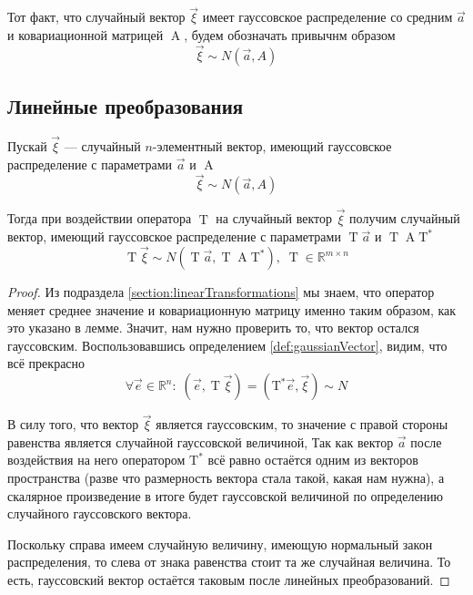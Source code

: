 \begin{definition}
    Тот факт, что случайный вектор $\vec{\xi}$ имеет гауссовское распределение
    со средним $\vec{a}$ и ковариационной матрицей
    $\operatorname{A}$, будем обозначать привычнм образом
    $$\vec{\xi} \sim N\left( \vec{a}, A \right)$$
\end{definition}

\subsection{Линейные преобразования}

\begin{lemma}\label{lemma:gaussTransformed}
    Пускай $\vec{\xi}$ --- случайный $n$-элементный вектор, имеющий гауссовское
    распределение с параметрами $\vec{a}$ и $\operatorname{A}$
    $$\vec{\xi} \sim N\left( \vec{a}, A \right)$$

    Тогда при воздействии оператора $\operatorname{T}$ на случайный вектор
    $\vec{\xi}$ получим случайный вектор, имеющий гауссовское распределение с
    параметрами $\operatorname{T} \vec{a} $ и
    $\operatorname{T} \operatorname{A} \operatorname{T^*}$
    $$\operatorname{T} \vec{\xi} \sim N\left( \operatorname{T}\vec{a} ,
        \operatorname{T} \operatorname{A} \operatorname{T^*} \right),\;
        \operatorname{T} \in \mathbb{R}^{m \times n}$$
\end{lemma}
\begin{proof}
    Из подраздела \ref{section:linearTransformations} мы знаем, что оператор
    меняет среднее значение и ковариационную матрицу именно таким образом, как
    это указано в лемме. Значит, нам нужно проверить то, что вектор остался
    гауссовским. Воспользовавшись определением \ref{def:gaussianVector}, видим,
    что всё прекрасно
    $$\forall \vec{e} \in \mathbb{R}^n:\;
        \left( \vec{e}, \operatorname{T} \vec{\xi} \right)
            = \left( \operatorname{T^*} \vec{e} , \vec{\xi} \right) \sim N$$

    В силу того, что вектор $\vec{\xi}$ является гауссовским, то значение с
    правой стороны равенства является случайной гауссовской величиной, Так как
    вектор $\vec{a}$ после воздействия на него оператором $\operatorname{T^*}$ всё
    равно остаётся одним из векторов пространства (разве что размерность вектора
    стала такой, какая нам нужна), а скалярное произведение в итоге будет
    гауссовской величиной по определению случайного гауссовского вектора.

    Поскольку справа имеем случайную величину, имеющую нормальный закон
    распределения, то слева от знака равенства стоит та же случайная величина.
    То есть, гауссовский вектор остаётся таковым после линейных преобразований.
\end{proof}

